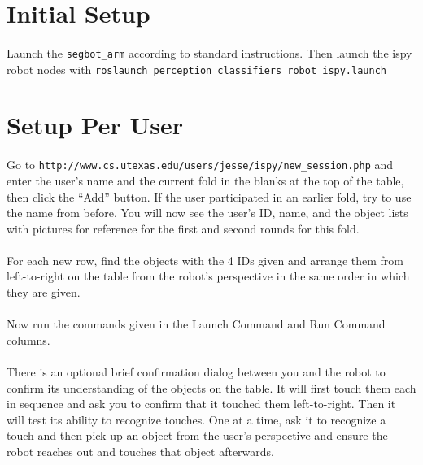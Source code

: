 \documentclass{article}
\begin{document}
\section{Initial Setup}

\paragraph{} Launch the \texttt{segbot\_arm} according to standard instructions. Then launch the ispy robot nodes with \texttt{roslaunch perception\_classifiers robot\_ispy.launch}

\section{Setup Per User}

\paragraph{} Go to \texttt{http://www.cs.utexas.edu/users/jesse/ispy/new\_session.php} and enter the user's name and the current fold in the blanks at the top of the table, then click the ``Add'' button. If the user participated in an earlier fold, try to use the name from before. You will now see the user's ID, name, and the object lists with pictures for reference for the first and second rounds for this fold.

\paragraph{} For each new row, find the objects with the 4 IDs given and arrange them from left-to-right on the table from the robot's perspective in the same order in which they are given.

\paragraph{} Now run the commands given in the Launch Command and Run Command columns.

\paragraph{} There is an optional brief confirmation dialog between you and the robot to confirm its understanding of the objects on the table. It will first touch them each in sequence and ask you to confirm that it touched them left-to-right. Then it will test its ability to recognize touches. One at a time, ask it to recognize a touch and then pick up an object from the user's perspective and ensure the robot reaches out and touches that object afterwards.
\end{document}
